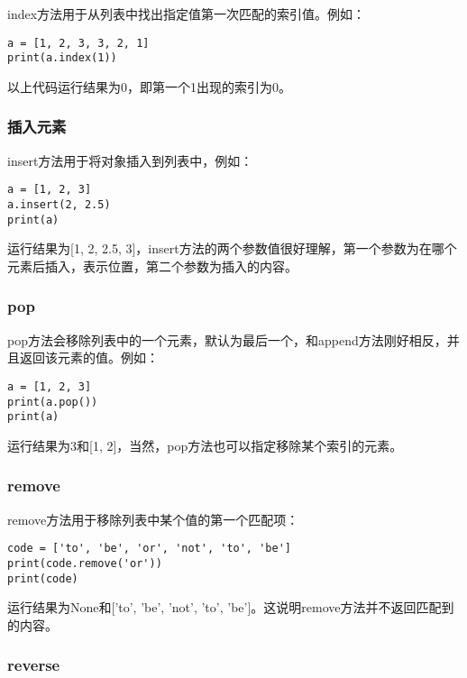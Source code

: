 index方法用于从列表中找出指定值第一次匹配的索引值。例如：

\begin{lstlisting}
a = [1, 2, 3, 3, 2, 1]
print(a.index(1))
\end{lstlisting}

以上代码运行结果为0，即第一个1出现的索引为0。

\subsubsection{插入元素}

insert方法用于将对象插入到列表中，例如：

\begin{lstlisting}
a = [1, 2, 3]
a.insert(2, 2.5)
print(a)
\end{lstlisting}

运行结果为[1, 2, 2.5, 3]，insert方法的两个参数值很好理解，第一个参数为在哪个元素后插入，表示位置，第二个参数为插入的内容。

\subsubsection{pop}

pop方法会移除列表中的一个元素，默认为最后一个，和append方法刚好相反，并且返回该元素的值。例如：

\begin{lstlisting}
a = [1, 2, 3]
print(a.pop())
print(a)
\end{lstlisting}

运行结果为3和[1, 2]，当然，pop方法也可以指定移除某个索引的元素。

\subsubsection{remove}

remove方法用于移除列表中某个值的第一个匹配项：

\begin{lstlisting}
code = ['to', 'be', 'or', 'not', 'to', 'be']
print(code.remove('or'))
print(code)
\end{lstlisting}

运行结果为None和['to', 'be', 'not', 'to', 'be']。这说明remove方法并不返回匹配到的内容。

\subsubsection{reverse}

